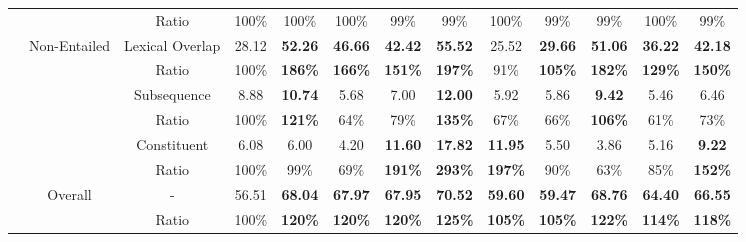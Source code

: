 \begin{table}[]
\begin{tabular}{|c|c|c|c|c|c|c|c|c|c|c|c|c|}
                          &                               & Ratio           & 100\%                     & 100\%                          & 100\%   & 99\%    & 99\%    & 100\%   & 99\%    & 99\%   & 100\%  & 99\%   \\ \cline{2-13} 
                          & \multirow{6}{*}{Non-Entailed} & Lexical Overlap & 28.12                     & \bf 52.26                          & \bf 46.66   & \bf 42.42   & \bf 55.52   & 25.52   & \bf 29.66   &\bf 51.06  & \bf 36.22  & \bf 42.18  \\ \cline{3-13} 
                          &                               & Ratio           & 100\%                     & \bf 186\%                          & \bf 166\%   & \bf 151\%   & \bf 197\%   & 91\%    & \bf 105\%   & \bf 182\%  & \bf 129\%  & \bf 150\%  \\ \cline{3-13} 
                          &                               & Subsequence     & 8.88                      & \bf 10.74                          & 5.68    & 7.00    & \bf 12.00   & 5.92    & 5.86    & \bf 9.42   & 5.46   & 6.46   \\ \cline{3-13} 
                          &                               & Ratio           & 100\%                     & \bf 121\%                          & 64\%    & 79\%    & \bf 135\%   & 67\%    & 66\%    & \bf 106\%  & 61\%   & 73\%   \\ \cline{3-13} 
                          &                               & Constituent     & 6.08                      & 6.00                           & 4.20    & \bf 11.60   & \bf 17.82   & \bf 11.95   & 5.50    & 3.86   & 5.16   & \bf 9.22   \\ \cline{3-13} 
                          &                               & Ratio           & 100\%                     & 99\%                           & 69\%    & \bf 191\%   & \bf 293\%   & \bf 197\%   & 90\%    & 63\%   & 85\%   & \bf 152\%  \\ \cline{2-13} 
                          & \multirow{2}{*}{Overall}      & -               & 56.51                     & \bf 68.04                          & \bf 67.97   & \bf 67.95   & \bf 70.52   & \bf 59.60   & \bf 59.47   & \bf 68.76  & \bf 64.40  & \bf 66.55  \\ \cline{3-13} 
                          &                               & Ratio           & 100\%                     & \bf 120\%                          & \bf 120\%   & \bf 120\%   & \bf 125\%   & \bf 105\%   & \bf 105\%   & \bf 122\%  & \bf 114\%  & \bf 118\%  \\ \hline

\end{tabular}
\end{table}
